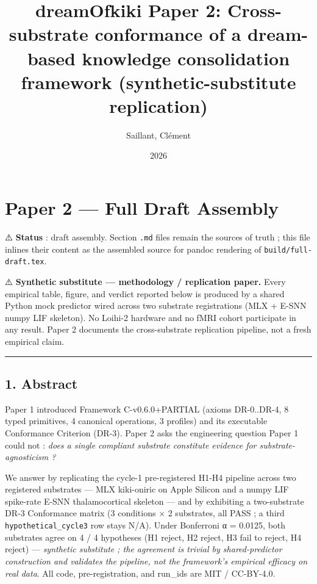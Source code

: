 \documentclass[
]{article}
\title{dreamOfkiki Paper 2: Cross-substrate conformance of a dream-based
knowledge consolidation framework (synthetic-substitute replication)}
\author{Saillant, Clément}
\date{2026}
\begin{document}
\maketitle

\section{Paper 2 --- Full Draft
Assembly}\label{paper-2-full-draft-assembly}

⚠️ \textbf{Status} : draft assembly. Section \texttt{.md} files remain
the sources of truth ; this file inlines their content as the assembled
source for pandoc rendering of \texttt{build/full-draft.tex}.

⚠️ \textbf{Synthetic substitute --- methodology / replication paper.}
Every empirical table, figure, and verdict reported below is produced by
a shared Python mock predictor wired across two substrate registrations
(MLX + E-SNN numpy LIF skeleton). No Loihi-2 hardware and no fMRI cohort
participate in any result. Paper 2 documents the cross-substrate
replication pipeline, not a fresh empirical claim.

\begin{center}\rule{0.5\linewidth}{0.5pt}\end{center}

\subsection{1. Abstract}\label{abstract}

Paper 1 introduced Framework C-v0.6.0+PARTIAL (axioms DR-0..DR-4, 8
typed primitives, 4 canonical operations, 3 profiles) and its executable
Conformance Criterion (DR-3). Paper 2 asks the engineering question
Paper 1 could not : \emph{does a single compliant substrate constitute
evidence for substrate-agnosticism ?}

We answer by replicating the cycle-1 pre-registered H1-H4 pipeline
across two registered substrates --- MLX kiki-oniric on Apple Silicon
and a numpy LIF spike-rate E-SNN thalamocortical skeleton --- and by
exhibiting a two-substrate DR-3 Conformance matrix (3 conditions × 2
substrates, all PASS ; a third \texttt{hypothetical\_cycle3} row stays
N/A). Under Bonferroni α = 0.0125, both substrates agree on 4 / 4
hypotheses (H1 reject, H2 reject, H3 fail to reject, H4 reject) ---
\emph{synthetic substitute ; the agreement is trivial by
shared-predictor construction and validates the pipeline, not the
framework's empirical efficacy on real data}. All code,
pre-registration, and run\_ids are MIT / CC-BY-4.0.
\end{document}
